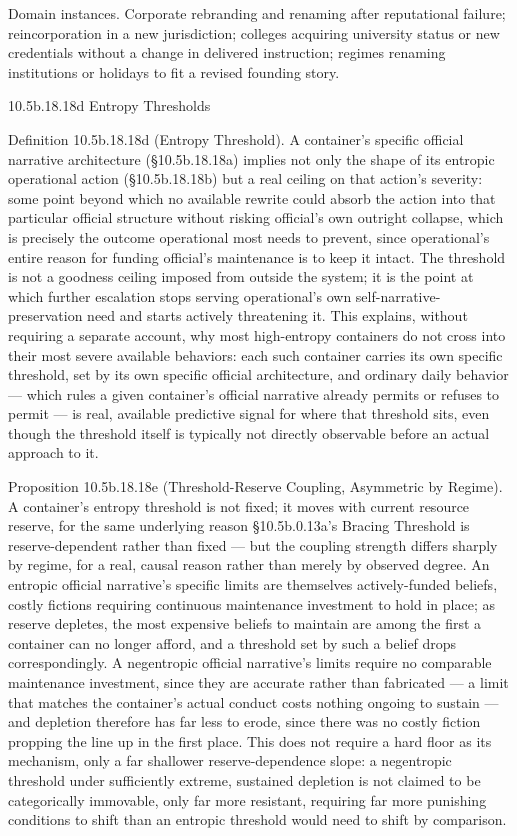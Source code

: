 \documentclass[
]{article}
\begin{document}
Domain instances. Corporate rebranding and renaming after reputational
failure; reincorporation in a new jurisdiction; colleges acquiring
university status or new credentials without a change in delivered
instruction; regimes renaming institutions or holidays to fit a revised
founding story.

10.5b.18.18d Entropy Thresholds

Definition 10.5b.18.18d (Entropy Threshold). A container's specific
official narrative architecture (§10.5b.18.18a) implies not only the
shape of its entropic operational action (§10.5b.18.18b) but a real
ceiling on that action's severity: some point beyond which no available
rewrite could absorb the action into that particular official structure
without risking official's own outright collapse, which is precisely the
outcome operational most needs to prevent, since operational's entire
reason for funding official's maintenance is to keep it intact. The
threshold is not a goodness ceiling imposed from outside the system; it
is the point at which further escalation stops serving operational's own
self-narrative-preservation need and starts actively threatening it.
This explains, without requiring a separate account, why most
high-entropy containers do not cross into their most severe available
behaviors: each such container carries its own specific threshold, set
by its own specific official architecture, and ordinary daily behavior
--- which rules a given container's official narrative already permits
or refuses to permit --- is real, available predictive signal for where
that threshold sits, even though the threshold itself is typically not
directly observable before an actual approach to it.

Proposition 10.5b.18.18e (Threshold-Reserve Coupling, Asymmetric by
Regime). A container's entropy threshold is not fixed; it moves with
current resource reserve, for the same underlying reason §10.5b.0.13a's
Bracing Threshold is reserve-dependent rather than fixed --- but the
coupling strength differs sharply by regime, for a real, causal reason
rather than merely by observed degree. An entropic official narrative's
specific limits are themselves actively-funded beliefs, costly fictions
requiring continuous maintenance investment to hold in place; as reserve
depletes, the most expensive beliefs to maintain are among the first a
container can no longer afford, and a threshold set by such a belief
drops correspondingly. A negentropic official narrative's limits require
no comparable maintenance investment, since they are accurate rather
than fabricated --- a limit that matches the container's actual conduct
costs nothing ongoing to sustain --- and depletion therefore has far
less to erode, since there was no costly fiction propping the line up in
the first place. This does not require a hard floor as its mechanism,
only a far shallower reserve-dependence slope: a negentropic threshold
under sufficiently extreme, sustained depletion is not claimed to be
categorically immovable, only far more resistant, requiring far more
punishing conditions to shift than an entropic threshold would need to
shift by comparison.
\end{document}
